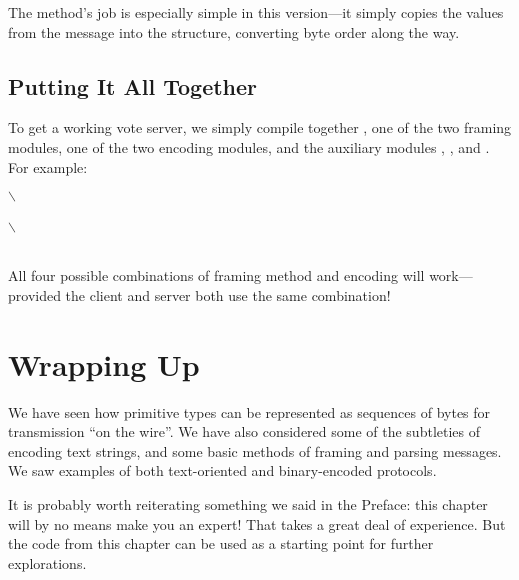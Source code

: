 
The  method's job is especially simple in this
version---it simply copies the values from the message into the
 structure, converting byte order along the way.

\subsection{Putting It All Together}

To get a working vote server, we simply compile together
, one of the two framing modules, one of the two
encoding modules, and the auxiliary modules ,
, %
and .  For example:

\begin{shell}
\prompt {} $\backslash$ \\
\hspace{1em} \\
\prompt {} $\backslash$ \\
\hspace{1em} \\
\prompt
\end{shell}

All four possible combinations of framing method and encoding will
work---provided the client and server both use the same combination!

\section{Wrapping Up}

We have seen how primitive types can be represented as sequences of
bytes for transmission ``on the wire''.  We have also considered some
of the subtleties of encoding text strings, and some basic methods of
framing and parsing messages.  We saw examples of both text-oriented
and binary-encoded protocols.

It is probably worth reiterating something we said in the Preface:
this chapter will by no means make you an expert!  That takes a great
deal of experience. But the code from this chapter can be used as a
starting point for further explorations.

